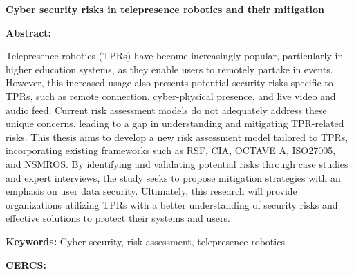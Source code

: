 
\newpage
\noindent\textbf{\large Cyber security risks in telepresence robotics and their mitigation}

\vspace*{3ex}

\noindent\textbf{Abstract:}
\vspace{-1ex}

Telepresence robotics (TPRs) have become increasingly popular, particularly
in higher education systems, as they enable users to remotely partake in
events. However, this increased usage also presents potential security risks
specific to TPRs, such as remote connection, cyber-physical presence, and
live video and audio feed. Current risk assessment models do not adequately
address these unique concerns, leading to a gap in understanding and
mitigating TPR-related risks. This thesis aims to develop a new risk
assessment model tailored to TPRs, incorporating existing frameworks such as
RSF, CIA, OCTAVE A, ISO27005, and NSMROS. By identifying and validating
potential risks through case studies and expert interviews, the study seeks
to propose mitigation strategies with an emphasis on user data security.
Ultimately, this research will provide organizations utilizing TPRs with a
better understanding of security risks and effective solutions to protect
their systems and users.

\vspace*{1ex}

\noindent\textbf{Keywords:} Cyber security, risk assessment, telepresence
robotics

\vspace*{1ex}

\noindent\textbf{CERCS:}

\vspace*{1ex}

